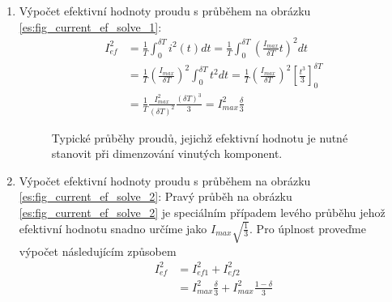 {    \begin{enumerate}
      \item Výpočet efektivní hodnoty proudu s průběhem na obrázku \ref{es:fig_current_ef_solve_1}:
        {\footnotesize
          \begin{align}\label{es:eq_Ief1_solve}
            I_{ef}^2 &= \frac{1}{T}\int_0^{\delta T}i^2(t)dt=
                        \frac{1}{T}\int_0^{\delta T}
                                          {\left(\frac{I_{max}}{\delta T}t\right)^2}dt \nonumber \\ 
                     &= \frac{1}{T}\left(\frac{I_{max}}{\delta T}\right)^2
                        \int_0^{\delta T}{t^2}dt =
                        \frac{1}{T}\left(\frac{I_{max}}{\delta T}\right)^2
                                   \left[\frac{t^3}{3}\right]_0^{\delta T}             \nonumber \\ 
                     &= \frac{1}{T}\frac{I_{max}^2}{(\delta T)^2}
                        \frac{(\delta T)^3}{3}=I_{max}^2\frac{\delta}{3}
          \end{align}
        } %
        \begin{figure}[hp!]
          \centering
          \caption{Typické průběhy proudů, jejichž efektivní hodnotu je nutné stanovit při 
                   dimenzování vinutých komponent.}
          \label{es:fig_Ief_solve1}
        \end{figure}
      \item Výpočet efektivní hodnoty proudu s průběhem na obrázku \ref{es:fig_current_ef_solve_2}:
            Pravý průběh na obrázku \ref{es:fig_current_ef_solve_2} je speciálním případem levého
            průběhu jehož efektivní hodnotu snadno určíme jako $I_{max}\sqrt{\frac{1}{3}}$. Pro
            úplnost proveďme výpočet následujícím způsobem
        \begin{align}\label{es:eq_Ief2_solve}
          I_{ef}^2 &= I_{ef1}^2+I_{ef2}^2                                   \nonumber \\
                   &= I_{max}^2\frac{\delta}{3}+I_{max}^2\frac{1-\delta}{3}

\end{align}
\end{enumerate}}
